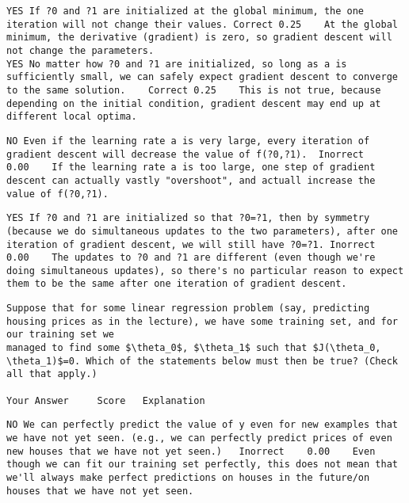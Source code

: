 \documentclass[]{article}
\begin{document}
\begin{verbatim}
YES If ?0 and ?1 are initialized at the global minimum, the one iteration will not change their values.	Correct	0.25	At the global minimum, the derivative (gradient) is zero, so gradient descent will not change the parameters.
YES No matter how ?0 and ?1 are initialized, so long as a is sufficiently small, we can safely expect gradient descent to converge to the same solution.	Correct	0.25	This is not true, because depending on the initial condition, gradient descent may end up at different local optima.
\end{verbatim}
\begin{verbatim}
NO Even if the learning rate a is very large, every iteration of gradient descent will decrease the value of f(?0,?1).	Inorrect	0.00	If the learning rate a is too large, one step of gradient descent can actually vastly "overshoot", and actuall increase the value of f(?0,?1).
\end{verbatim}
\begin{verbatim}
YES If ?0 and ?1 are initialized so that ?0=?1, then by symmetry (because we do simultaneous updates to the two parameters), after one iteration of gradient descent, we will still have ?0=?1.	Inorrect	0.00	The updates to ?0 and ?1 are different (even though we're doing simultaneous updates), so there's no particular reason to expect them to be the same after one iteration of gradient descent.
\end{verbatim}
\begin{verbatim}
Suppose that for some linear regression problem (say, predicting housing prices as in the lecture), we have some training set, and for our training set we 
managed to find some $\theta_0$, $\theta_1$ such that $J(\theta_0, \theta_1)$=0. Which of the statements below must then be true? (Check all that apply.)

Your Answer		Score	Explanation
\end{verbatim}
\begin{verbatim}
NO We can perfectly predict the value of y even for new examples that we have not yet seen. (e.g., we can perfectly predict prices of even new houses that we have not yet seen.)	Inorrect	0.00	Even though we can fit our training set perfectly, this does not mean that we'll always make perfect predictions on houses in the future/on houses that we have not yet seen.
\end{verbatim}
\end{document}
